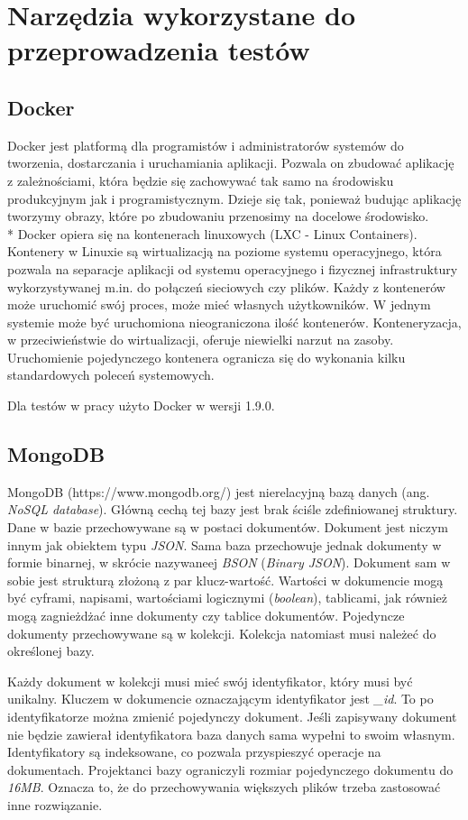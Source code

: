 \chapter{Narzędzia wykorzystane do przeprowadzenia testów}

\section{Docker}
Docker jest platformą dla programistów i administratorów systemów do tworzenia, dostarczania i uruchamiania aplikacji. Pozwala on zbudować aplikację z zależnościami, która  będzie się zachowywać tak samo na środowisku produkcyjnym jak i programistycznym. Dzieje się tak, ponieważ budując aplikację tworzymy obrazy, które po zbudowaniu przenosimy na docelowe środowisko.\\*
Docker opiera się na kontenerach linuxowych (LXC - Linux Containers). Kontenery w Linuxie są wirtualizacją na poziome systemu operacyjnego, która pozwala na separacje aplikacji od systemu operacyjnego i fizycznej infrastruktury wykorzystywanej m.in. do połączeń sieciowych czy plików. Każdy z kontenerów może uruchomić swój proces, może mieć własnych użytkowników. W jednym systemie może być uruchomiona nieograniczona ilość kontenerów. Konteneryzacja, w przeciwieństwie do wirtualizacji, oferuje niewielki narzut na zasoby. Uruchomienie pojedynczego kontenera ogranicza się do wykonania kilku standardowych poleceń systemowych. 


Dla testów w pracy użyto Docker w wersji 1.9.0.

\section{MongoDB}
MongoDB (https://www.mongodb.org/) jest nierelacyjną bazą danych (ang. \textsl{NoSQL database}). Główną cechą tej bazy jest brak ściśle zdefiniowanej struktury. Dane w bazie przechowywane są w postaci dokumentów. Dokument jest niczym innym jak obiektem typu \textsl{JSON}. Sama baza  przechowuje jednak dokumenty w formie binarnej, w skrócie nazywaneej \textsl{BSON} (\textsl{Binary JSON}). Dokument sam w sobie jest strukturą złożoną z par klucz-wartość. Wartości w dokumencie mogą być cyframi, napisami, wartościami logicznymi (\textsl{boolean}), tablicami, jak również mogą zagnieżdżać inne dokumenty czy tablice dokumentów. Pojedyncze dokumenty przechowywane są w kolekcji. Kolekcja natomiast musi należeć do określonej bazy.

Każdy dokument w kolekcji musi mieć swój identyfikator, który  musi być unikalny. Kluczem w dokumencie oznaczającym identyfikator jest \textsl{\_id}. To po identyfikatorze można zmienić pojedynczy dokument. Jeśli zapisywany dokument nie będzie zawierał identyfikatora baza danych sama wypełni to swoim własnym. Identyfikatory są indeksowane, co pozwala przyspieszyć operacje na dokumentach. Projektanci bazy ograniczyli rozmiar pojedynczego dokumentu do \textsl{16MB}. Oznacza to, że do przechowywania większych plików trzeba zastosować inne rozwiązanie.

